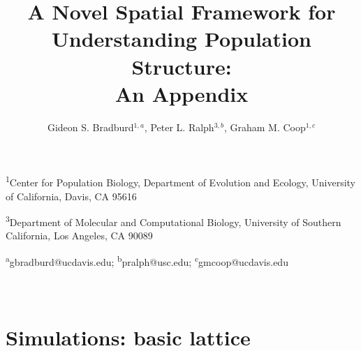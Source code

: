 \documentclass[12pt]{article}
\title{A Novel Spatial Framework for Understanding Population Structure:\\An Appendix}
\date{\vspace{-5ex}}
\author{Gideon S. Bradburd$^{1,a}$, Peter L. Ralph$^{3,b}$, Graham M. Coop$^{1,c}$}
\begin{document}
\maketitle

\textsuperscript{1}Center for Population Biology, Department of Evolution and Ecology, University of California, Davis, CA 95616

\textsuperscript{3}Department of Molecular and Computational Biology, University of Southern California, Los Angeles, CA 90089

\textsuperscript{a}gbradburd@ucdavis.edu; 
\textsuperscript{b}pralph@usc.edu;
\textsuperscript{c}gmcoop@ucdavis.edu\\\\\

\newpage
\section*{Simulations: basic lattice}
\tiny
\end{document}
